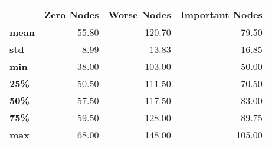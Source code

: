 \begin{tabular}{lrrr}
\toprule
{} &  Zero Nodes &  Worse Nodes &  Important Nodes \\
\midrule
\textbf{mean} &       55.80 &       120.70 &            79.50 \\
\textbf{std } &        8.99 &        13.83 &            16.85 \\
\textbf{min } &       38.00 &       103.00 &            50.00 \\
\textbf{25\% } &       50.50 &       111.50 &            70.50 \\
\textbf{50\% } &       57.50 &       117.50 &            83.00 \\
\textbf{75\% } &       59.50 &       128.00 &            89.75 \\
\textbf{max } &       68.00 &       148.00 &           105.00 \\
\bottomrule
\end{tabular}
